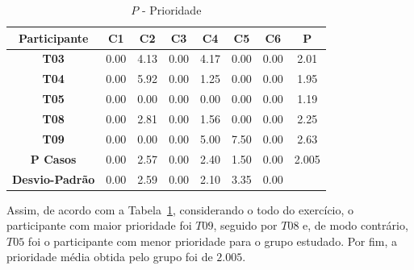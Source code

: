 
\begin{table}[htbp]
	\centering
	\caption{$P$ - Prioridade}
	\begin{tabular}{|c|c|c|c|c|c|c|c}
		\hline
		\rowcolor[HTML]{D9D9D9} 
		\textbf{Participante} & \textbf{C1} & \textbf{C2} & \textbf{C3} & \textbf{C4} & \textbf{C5} & \textbf{C6} & \multicolumn{1}{c|}{\cellcolor[HTML]{D9D9D9}\textbf{P}} \\ \hline
		\rowcolor[HTML]{FFFFFF} 
		\textbf{T03} & 0.00 & 4.13 & 0.00 & 4.17 & 0.00 & 0.00 & \multicolumn{1}{c|}{\cellcolor[HTML]{FFFFFF}2.01} \\ \hline
		\rowcolor[HTML]{E7E6E6} 
		\textbf{T04} & 0.00 & 5.92 & 0.00 & 1.25 & 0.00 & 0.00 & \multicolumn{1}{c|}{\cellcolor[HTML]{E7E6E6}1.95} \\ \hline
		\rowcolor[HTML]{FFFFFF} 
		\textbf{T05} & 0.00 & 0.00 & 0.00 & 0.00 & 0.00 & 0.00 & \multicolumn{1}{c|}{\cellcolor[HTML]{FFFFFF}1.19} \\ \hline
		\rowcolor[HTML]{E7E6E6} 
		\textbf{T08} & 0.00 & 2.81 & 0.00 & 1.56 & 0.00 & 0.00 & \multicolumn{1}{c|}{\cellcolor[HTML]{E7E6E6}2.25} \\ \hline
		\rowcolor[HTML]{FFFFFF} 
		\textbf{T09} & 0.00 & 0.00 & 0.00 & 5.00 & 7.50 & 0.00 & \multicolumn{1}{c|}{\cellcolor[HTML]{FFFFFF}2.63} \\ \hline
		\rowcolor[HTML]{D0CECE} 
		\textbf{P Casos} & 0.00 & 2.57 & 0.00 & 2.40 & 1.50 & 0.00 & \multicolumn{1}{c|}{\cellcolor[HTML]{D0CECE}2.005} \\ \hline
		\textbf{Desvio-Padrão} & 0.00 & 2.59 & 0.00 & 2.10 & 3.35 & 0.00 & \multicolumn{1}{l}{} \\ \cline{1-7}
	\end{tabular}
	\label{tab:F3_A4_P}
\end{table}

Assim, de acordo com a Tabela~\ref{tab:F3_A4_P}, considerando o todo do exercício, o participante com maior prioridade foi $T09$, seguido por $T08$ e, de modo contrário, $T05$ foi o participante com menor prioridade para o grupo estudado. Por fim, a prioridade média obtida pelo grupo foi de $2.005$.


